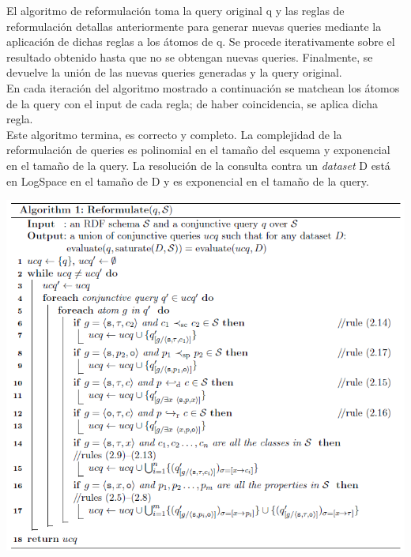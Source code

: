 \documentclass[10pt,a4paper]{article}
\begin{document}
El algoritmo de reformulación toma la query original q y las reglas de reformulación detallas anteriormente para generar nuevas queries mediante la aplicación de dichas reglas a los átomos de q. Se procede iterativamente sobre el resultado obtenido hasta que no se obtengan nuevas queries. Finalmente, se devuelve la unión de las nuevas queries generadas y la query original.\\

En cada iteración del algoritmo mostrado a continuación se matchean los átomos de la query con el input de cada regla; de haber coincidencia, se aplica dicha regla.\\

Este algoritmo termina, es correcto y completo. La complejidad de la reformulación de queries es polinomial en el tamaño del esquema y exponencial en el tamaño de la query. La resolución de la consulta contra un \textit{dataset} D está en LogSpace en el tamaño de D y es exponencial en el tamaño de la query.\\

\vspace{100 mm}

\begin{center}
\includegraphics[scale=0.55]{imgs/06.png}
\end{center}

\newpage
\end{document}
